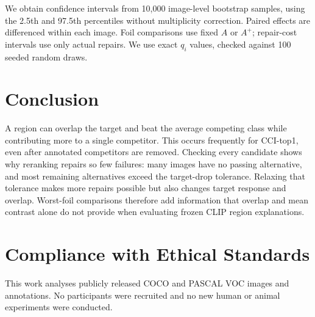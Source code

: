 \documentclass[10pt]{article}
\begin{document}
We obtain confidence intervals from 10,000 image-level bootstrap samples,
using the 2.5th and 97.5th percentiles without multiplicity correction.
Paired effects are differenced within each image. Foil comparisons use
fixed $A$ or $A^+$; repair-cost intervals use only actual repairs.
We use exact $q_i$ values, checked against 100 seeded random draws.

\section{Conclusion}
A region can overlap the target and beat the average competing class while
contributing more to a single competitor. This occurs frequently for
CCI-top1, even after annotated competitors are removed. Checking every
candidate shows why reranking repairs so few failures: many images have
no passing alternative, and most remaining alternatives exceed the
target-drop tolerance. Relaxing that tolerance makes more repairs possible
but also changes target response and overlap. Worst-foil comparisons
therefore add information that overlap and mean contrast alone do not
provide when evaluating frozen CLIP region explanations.

\clearpage
\balance

\section*{Compliance with Ethical Standards}
This work analyses publicly released COCO and PASCAL VOC images and
annotations. No participants were recruited and no new human or animal
experiments were conducted.
\end{document}
